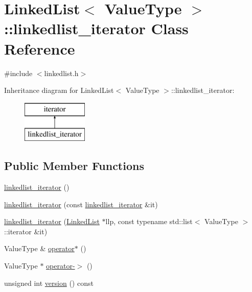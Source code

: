 \hypertarget{classLinkedList_1_1linkedlist__iterator}{}\section{Linked\+List$<$ Value\+Type $>$\+:\+:linkedlist\+\_\+iterator Class Reference}
\label{classLinkedList_1_1linkedlist__iterator}


{\ttfamily \#include $<$linkedlist.\+h$>$}

Inheritance diagram for Linked\+List$<$ Value\+Type $>$\+:\+:linkedlist\+\_\+iterator\+:\begin{figure}[H]
\begin{center}
\leavevmode
\includegraphics[height=2.000000cm]{classLinkedList_1_1linkedlist__iterator}
\end{center}
\end{figure}
\subsection*{Public Member Functions}
\begin{DoxyCompactItemize}
\item 
\mbox{\hyperlink{classLinkedList_1_1linkedlist__iterator_a11bec34ee4dbb185e0a6f26d029a1095}{linkedlist\+\_\+iterator}} ()
\item 
\mbox{\hyperlink{classLinkedList_1_1linkedlist__iterator_a2a6a43c0886bbf02cbf4954f194eadb2}{linkedlist\+\_\+iterator}} (const \mbox{\hyperlink{classLinkedList_1_1linkedlist__iterator}{linkedlist\+\_\+iterator}} \&it)
\item 
\mbox{\hyperlink{classLinkedList_1_1linkedlist__iterator_ad82a966259fffecaf3143e86d7da4132}{linkedlist\+\_\+iterator}} (\mbox{\hyperlink{classLinkedList}{Linked\+List}} $\ast$llp, const typename std\+::list$<$ Value\+Type $>$\+::iterator \&it)
\item 
Value\+Type \& \mbox{\hyperlink{classLinkedList_1_1linkedlist__iterator_ae7b3826e734ec2f7c79f5196fad83989}{operator$\ast$}} ()
\item 
Value\+Type $\ast$ \mbox{\hyperlink{classLinkedList_1_1linkedlist__iterator_a5ba42337ec7bae549bb135838933b0ea}{operator-\/$>$}} ()
\item 
unsigned int \mbox{\hyperlink{classLinkedList_1_1linkedlist__iterator_a0aa696ccb72cbf928535d6b646bac1aa}{version}} () const
\end{DoxyCompactItemize}


